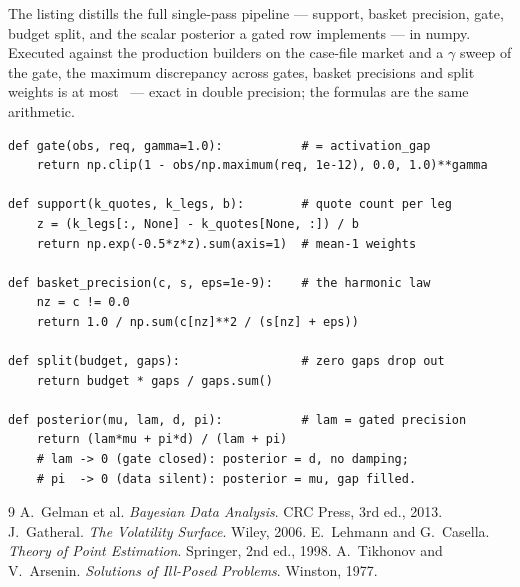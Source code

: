 \documentclass[11pt]{article}
\begin{document}
The listing distills the full single-pass pipeline --- support,
basket precision, gate, budget split, and the scalar posterior a
gated row implements --- in numpy.  Executed against the production
builders on the case-file market and a $\gamma$ sweep of the gate,
the maximum discrepancy across gates, basket precisions and split
weights is at most \pflrefagree\ --- exact in double precision; the
formulas are the same arithmetic.

\begin{lstlisting}[caption={The gated pipeline (verified against
\texttt{calib/precision.py} and \texttt{calib/operators.py}) and the
scalar posterior a gated row implements.}]
def gate(obs, req, gamma=1.0):           # = activation_gap
    return np.clip(1 - obs/np.maximum(req, 1e-12), 0.0, 1.0)**gamma

def support(k_quotes, k_legs, b):        # quote count per leg
    z = (k_legs[:, None] - k_quotes[None, :]) / b
    return np.exp(-0.5*z*z).sum(axis=1)  # mean-1 weights

def basket_precision(c, s, eps=1e-9):    # the harmonic law
    nz = c != 0.0
    return 1.0 / np.sum(c[nz]**2 / (s[nz] + eps))

def split(budget, gaps):                 # zero gaps drop out
    return budget * gaps / gaps.sum()

def posterior(mu, lam, d, pi):           # lam = gated precision
    return (lam*mu + pi*d) / (lam + pi)
    # lam -> 0 (gate closed): posterior = d, no damping;
    # pi  -> 0 (data silent): posterior = mu, gap filled.
\end{lstlisting}

\begin{thebibliography}{9}
 A.~Gelman et al. \emph{Bayesian Data Analysis}.
CRC Press, 3rd ed., 2013.
 J.~Gatheral. \emph{The Volatility Surface}.
Wiley, 2006.
 E.~Lehmann and G.~Casella. \emph{Theory
of Point Estimation}. Springer, 2nd ed., 1998.
 A.~Tikhonov and V.~Arsenin. \emph{Solutions of
Ill-Posed Problems}. Winston, 1977.
\end{thebibliography}
\end{document}
